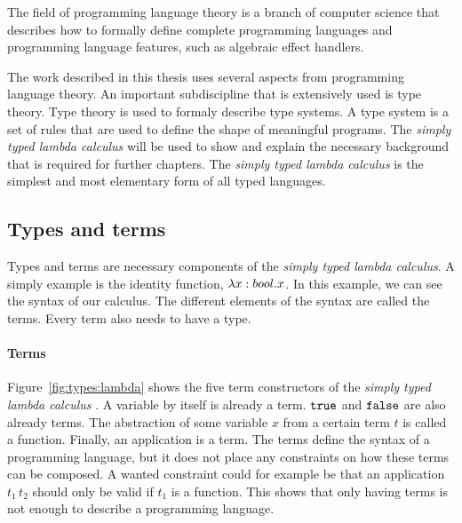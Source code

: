 The field of programming language theory is a branch of computer science that describes how to formally define complete programming languages and programming language features, such as algebraic effect handlers.

The work described in this thesis uses several aspects from programming language theory. An important subdiscipline that is extensively used is type theory. Type theory is used to formaly describe type systems. A type system is a set of rules that are used to define the shape of meaningful programs. The \textit{simply typed lambda calculus} will be used to show and explain the necessary background that is required for further chapters. The \textit{simply typed lambda calculus} is the simplest and most elementary form of all typed languages. \cite{pierce2002types}
\subsection{Types and terms}\label{simpletypes}
Types and terms are necessary components of the \textit{simply typed lambda calculus}. A simply example is the identity function, $\lambda x \mathrel{:} bool . x$. In this example, we can see the syntax of our calculus. The different elements of the syntax are called the terms. Every term also needs to have a type. 

\paragraph{Terms}
Figure~\ref{fig:types:lambda} shows the five term constructors of the \textit{simply typed lambda calculus} \cite{mitchell1996foundations}. A variable by itself is already a term. $\mathtt{true}$ and $\mathtt{false}$ are also already terms. The abstraction of some variable $x$ from a certain term $t$ is called a function. Finally, an application is a term. The terms define the syntax of a programming language, but it does not place any constraints on how these terms can be composed. A wanted constraint could for example be that an application $t_1 \, t_2$ should only be valid if $t_1$ is a function. This shows that only having terms is not enough to describe a programming language. \cite{hindley1986introduction}

